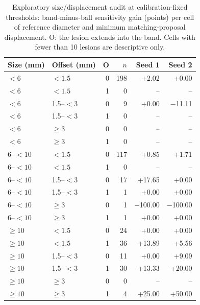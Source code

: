 \begin{table}[!t]
\centering
\footnotesize
\setlength{\tabcolsep}{4pt}
\small
\caption{Exploratory size/displacement audit at calibration-fixed thresholds: band-minus-ball sensitivity gain (points) per cell of reference diameter and minimum matching-proposal displacement. O: the lesion extends into the band. Cells with fewer than 10 lesions are descriptive only.}
\label{tab:size_displacement}
\begin{tabular}{@{}llrrrr@{}}
\toprule
Size (mm) & Offset (mm) & O & $n$ & Seed 1 & Seed 2 \\
\midrule
$<6$ & $<1.5$ & 0 & 198 & +2.02 & +0.00 \\
$<6$ & $<1.5$ & 1 & 0 & -- & -- \\
$<6$ & 1.5--$<3$ & 0 & 9 & +0.00 & $-$11.11 \\
$<6$ & 1.5--$<3$ & 1 & 0 & -- & -- \\
$<6$ & $\ge3$ & 0 & 0 & -- & -- \\
$<6$ & $\ge3$ & 1 & 0 & -- & -- \\
6--$<10$ & $<1.5$ & 0 & 117 & +0.85 & +1.71 \\
6--$<10$ & $<1.5$ & 1 & 0 & -- & -- \\
6--$<10$ & 1.5--$<3$ & 0 & 17 & +17.65 & +0.00 \\
6--$<10$ & 1.5--$<3$ & 1 & 1 & +0.00 & +0.00 \\
6--$<10$ & $\ge3$ & 0 & 1 & $-$100.00 & $-$100.00 \\
6--$<10$ & $\ge3$ & 1 & 1 & +0.00 & +0.00 \\
$\ge10$ & $<1.5$ & 0 & 24 & +0.00 & +0.00 \\
$\ge10$ & $<1.5$ & 1 & 36 & +13.89 & +5.56 \\
$\ge10$ & 1.5--$<3$ & 0 & 11 & +0.00 & +9.09 \\
$\ge10$ & 1.5--$<3$ & 1 & 30 & +13.33 & +20.00 \\
$\ge10$ & $\ge3$ & 0 & 0 & -- & -- \\
$\ge10$ & $\ge3$ & 1 & 4 & +25.00 & +50.00 \\
\bottomrule
\end{tabular}
\end{table}
